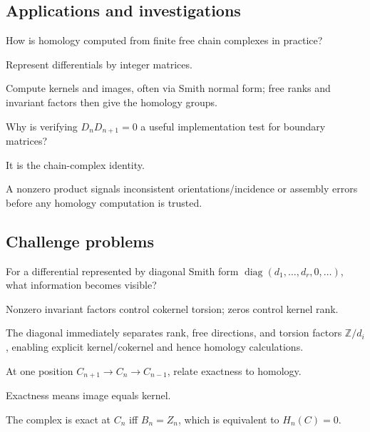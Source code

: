 \subsection*{Applications and investigations}

\begin{exercise}\label{exr:viii16-ped-13}
How is homology computed from finite free chain complexes in practice?
\end{exercise}
\begin{hint}
Represent differentials by integer matrices.
\end{hint}
\begin{solution}
Compute kernels and images, often via Smith normal form; free ranks and invariant factors then give the homology groups.
\end{solution}

\begin{exercise}\label{exr:viii16-ped-14}
Why is verifying $D_nD_{n+1}=0$ a useful implementation test for boundary matrices?
\end{exercise}
\begin{hint}
It is the chain-complex identity.
\end{hint}
\begin{solution}
A nonzero product signals inconsistent orientations/incidence or assembly errors before any homology computation is trusted.
\end{solution}

\subsection*{Challenge problems}

\begin{exercise}\label{exr:viii16-ped-15}
For a differential represented by diagonal Smith form $\operatorname{diag}(d_1,\ldots,d_r,0,\ldots)$, what information becomes visible?
\end{exercise}
\begin{hint}
Nonzero invariant factors control cokernel torsion; zeros control kernel rank.
\end{hint}
\begin{solution}
The diagonal immediately separates rank, free directions, and torsion factors $\mathbb Z/d_i$, enabling explicit kernel/cokernel and hence homology calculations.
\end{solution}

\begin{exercise}\label{exr:viii16-ped-16}
At one position $C_{n+1}\to C_n\to C_{n-1}$, relate exactness to homology.
\end{exercise}
\begin{hint}
Exactness means image equals kernel.
\end{hint}
\begin{solution}
The complex is exact at $C_n$ iff $B_n=Z_n$, which is equivalent to $H_n(C)=0$.
\end{solution}

